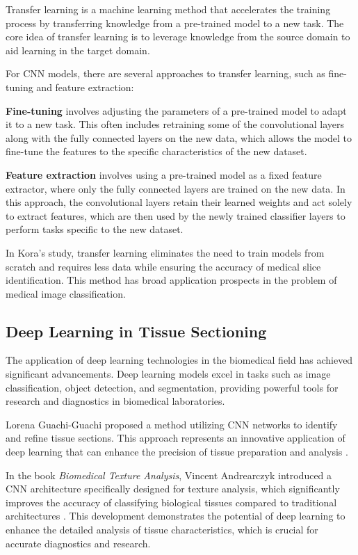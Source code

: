 Transfer learning is a machine learning method that accelerates the training process by transferring knowledge from a pre-trained model to a new task. The core idea of transfer learning is to leverage knowledge from the source domain to aid learning in the target domain\cite{4.30 4}.

For CNN models, there are several approaches to transfer learning, such as fine-tuning and feature extraction: 

\textbf{Fine-tuning} involves adjusting the parameters of a pre-trained model to adapt it to a new task. This often includes retraining some of the convolutional layers along with the fully connected layers on the new data, which allows the model to fine-tune the features to the specific characteristics of the new dataset\cite{4.30 5}.

\textbf{Feature extraction} involves using a pre-trained model as a fixed feature extractor, where only the fully connected layers are trained on the new data. In this approach, the convolutional layers retain their learned weights and act solely to extract features, which are then used by the newly trained classifier layers to perform tasks specific to the new dataset\cite{4.30 6}.

In Kora's study\cite{5.1 3}, transfer learning eliminates the need to train models from scratch and requires less data while ensuring the accuracy of medical slice identification. This method has broad application prospects in the problem of medical image classification.

\subsection{Deep Learning in Tissue Sectioning}

The application of deep learning technologies in the biomedical field has achieved significant advancements. Deep learning models excel in tasks such as image classification, object detection, and segmentation, providing powerful tools for research and diagnostics in biomedical laboratories.

Lorena Guachi-Guachi proposed a method utilizing CNN networks to identify and refine tissue sections. This approach represents an innovative application of deep learning that can enhance the precision of tissue preparation and analysis \cite{LR.7}.

In the book \textit{Biomedical Texture Analysis}, Vincent Andrearczyk introduced a CNN architecture specifically designed for texture analysis, which significantly improves the accuracy of classifying biological tissues compared to traditional architectures \cite{LR.8}. This development demonstrates the potential of deep learning to enhance the detailed analysis of tissue characteristics, which is crucial for accurate diagnostics and research.


